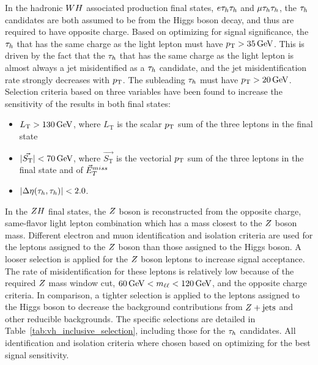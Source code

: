 In the hadronic $WH$ associated production final states, $e\tau_{h}\tau_{h}$ and 
$\mu\tau_{h}\tau_{h}$,
the $\tau_{h}$ candidates are both assumed to be from the Higgs boson decay, and thus are 
required to have opposite charge. Based on optimizing for signal significance,
the $\tau_{h}$ that has the same charge as the light lepton must 
have $p_\mathrm{T} > 35\,\mathrm{GeV}$. This is driven 
by the fact that the $\tau_{h}$ that has the same charge as the light lepton is almost 
always a jet misidentified as a $\tau_{h}$ candidate, and the jet misidentification 
rate strongly decreases with $p_\mathrm{T}$. 
The subleading $\tau_{h}$ must have $p_\mathrm{T} > 20\,\mathrm{GeV}$. 
Selection criteria based on three variables 
have been found to increase the sensitivity of the results in both final states:
\begin{itemize}
\item $L_{\text{T}}>130\,\mathrm{GeV}$, where $L_{\text{T}}$ is the scalar $p_\mathrm{T}$ sum of the three leptons in the final state
\item $\lvert\vec{S_{\text{T}}}\rvert<70\,\mathrm{GeV}$, where $\vec{S_{\text{T}}}$ is the vectorial $p_\mathrm{T}$ sum of the three leptons in the final state and of $\vec{E}^{miss}_T$
\item $\lvert\Delta\eta(\tau_{h},\tau_{h})\rvert<2.0$.
\end{itemize}



In the $ZH$ final states, the $Z$ boson is reconstructed from the opposite charge, same-flavor
light lepton combination which has a mass closest to the $Z$ boson mass. Different 
electron and muon identification and isolation criteria are used for the leptons 
assigned to the $Z$ boson than those assigned to the Higgs boson. A looser
selection is applied for the $Z$ boson leptons to increase signal acceptance. The
rate of misidentification for these leptons is relatively low because of the required $Z$ mass
window cut, $60\,\mathrm{GeV} < m_{\ell\ell} < 120\,\mathrm{GeV}$, and the opposite charge criteria.
In comparison, a tighter selection is applied to the leptons assigned to the Higgs boson to
decrease the background contributions from $Z+\textrm{jets}$ and other reducible
backgrounds. The specific selections are detailed in Table~\ref{tab:vh_inclusive_selection},
including those for the $\tau_{h}$ candidates. All identification and isolation criteria
where chosen based on optimizing for the best signal sensitivity.

